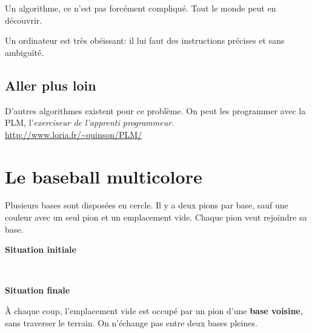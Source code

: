 \documentclass[a7paper,pagesize,DIV=14,10pt]{scrbook}
\begin{document}
Un algorithme, ce n'est pas forcément compliqué. Tout le monde peut en découvrir.

\smallskip
Un ordinateur est très obéissant: il lui faut des instructions
précises et sans ambiguïté.

\vspace{-.5\baselineskip}
\subsection*{Aller plus loin}
\vspace{-.5\baselineskip}
D'autres algorithmes existent pour ce problème. On peut les programmer
avec la PLM, l'\textit{exerciseur de l'apprenti programmeur}.\\
{\small\color{blue}\url{http://www.loria.fr/~quinson/PLM/}}

\newpage
\section*{Le baseball multicolore}


\vspace{-.5\baselineskip} %
Plusieurs bases sont disposées en cercle.  Il y a deux pions par base,
sauf une couleur avec un seul pion et un emplacement vide.  Chaque
pion veut rejoindre sa base.

\begin{minipage}{.5\linewidth}\center
   {}

 \textbf{Situation initiale} 
\end{minipage}~
\begin{minipage}{.5\linewidth}\center

  \textbf{Situation finale}
\end{minipage}

À chaque coup, l'emplacement vide est occupé par un pion d'une
\textbf{base voisine}, sans traverser le terrain. On n'échange pas
entre deux bases pleines.
\end{document}
